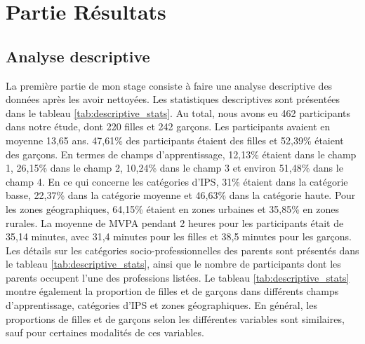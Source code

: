 \documentclass[12pt,a4paper]{article}
\begin{document}
	\section{Partie Résultats}
	\subsection{Analyse descriptive}
	La première partie de mon stage consiste à faire une analyse descriptive des données après les avoir nettoyées. 
	Les statistiques descriptives sont présentées dans le tableau \ref{tab:descriptive_stats}.
	Au total, nous avons eu 462 participants dans notre étude, dont 220 filles et 242 garçons. Les participants avaient en moyenne 13,65 ans. 47,61\% des participants étaient des filles et 52,39\% étaient des garçons. En termes de champs d'apprentissage, 12,13\% étaient dans le champ 1, 26,15\% dans le champ 2, 10,24\% dans le champ 3 et environ 51,48\% dans le champ 4. En ce qui concerne les catégories d'IPS, 31\% étaient dans la catégorie basse, 22,37\% dans la catégorie moyenne et 46,63\% dans la catégorie haute. Pour les zones géographiques, 64,15\% étaient en zones urbaines et 35,85\% en zones rurales. La moyenne de MVPA pendant 2 heures pour les participants était de 35,14 minutes, avec 31,4 minutes pour les filles et 38,5 minutes pour les garçons. Les détails sur les catégories socio-professionnelles des parents sont présentés dans le tableau \ref{tab:descriptive_stats}, ainsi que le nombre de participants dont les parents occupent l'une des professions listées. Le tableau \ref{tab:descriptive_stats} montre également la proportion de filles et de garçons dans différents champs d'apprentissage, catégories d'IPS et zones géographiques. En général, les proportions de filles et de garçons selon les différentes variables sont similaires, sauf pour certaines modalités de ces variables.
	
\end{document}
